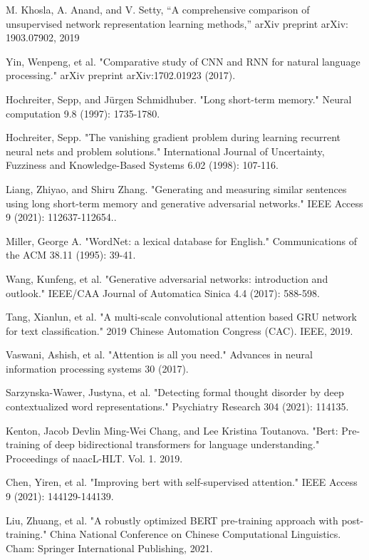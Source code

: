 \documentclass[conference]{IEEEtran}
\begin{document}
\begin{thebibliography}{00}
 M. Khosla, A. Anand, and V. Setty, “A comprehensive comparison of unsupervised network representation learning methods,” arXiv preprint arXiv: 1903.07902, 2019

 Yin, Wenpeng, et al. "Comparative study of CNN and RNN for natural language processing." arXiv preprint arXiv:1702.01923 (2017).

 Hochreiter, Sepp, and Jürgen Schmidhuber. "Long short-term memory." Neural computation 9.8 (1997): 1735-1780.

 Hochreiter, Sepp. "The vanishing gradient problem during learning recurrent neural nets and problem solutions." International Journal of Uncertainty, Fuzziness and Knowledge-Based Systems 6.02 (1998): 107-116.

 Liang, Zhiyao, and Shiru Zhang. "Generating and measuring similar sentences using long short-term memory and generative adversarial networks." IEEE Access 9 (2021): 112637-112654..

 Miller, George A. "WordNet: a lexical database for English." Communications of the ACM 38.11 (1995): 39-41.

 Wang, Kunfeng, et al. "Generative adversarial networks: introduction and outlook." IEEE/CAA Journal of Automatica Sinica 4.4 (2017): 588-598.

 Tang, Xianlun, et al. "A multi-scale convolutional attention based GRU network for text classification." 2019 Chinese Automation Congress (CAC). IEEE, 2019.

 Vaswani, Ashish, et al. "Attention is all you need." Advances in neural information processing systems 30 (2017).

 Sarzynska-Wawer, Justyna, et al. "Detecting formal thought disorder by deep contextualized word representations." Psychiatry Research 304 (2021): 114135.

 Kenton, Jacob Devlin Ming-Wei Chang, and Lee Kristina Toutanova. "Bert: Pre-training of deep bidirectional transformers for language understanding." Proceedings of naacL-HLT. Vol. 1. 2019.

 Chen, Yiren, et al. "Improving bert with self-supervised attention." IEEE Access 9 (2021): 144129-144139.

 Liu, Zhuang, et al. "A robustly optimized BERT pre-training approach with post-training." China National Conference on Chinese Computational Linguistics. Cham: Springer International Publishing, 2021.


\end{thebibliography}
\end{document}
